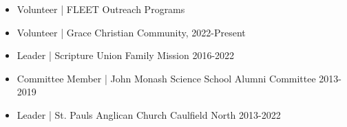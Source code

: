 \documentclass[10pt,a4paper,ragged2e,withhyper]{altacv}
\begin{document}
\begin{paracol}{2}
        \begin{itemize}
        	\item Volunteer | FLEET Outreach Programs
        	\item Volunteer | Grace Christian Community, 2022-Present\\
        	\item Leader | Scripture Union Family Mission 2016-2022\\
			\item Committee Member | John Monash Science School Alumni Committee 2013-2019
        	\item Leader | St. Pauls Anglican Church Caulfield North 2013-2022
        \end{itemize}
        
        
        
        
        
        \newpage
        
        \switchcolumn
        

\end{paracol}
\end{document}
